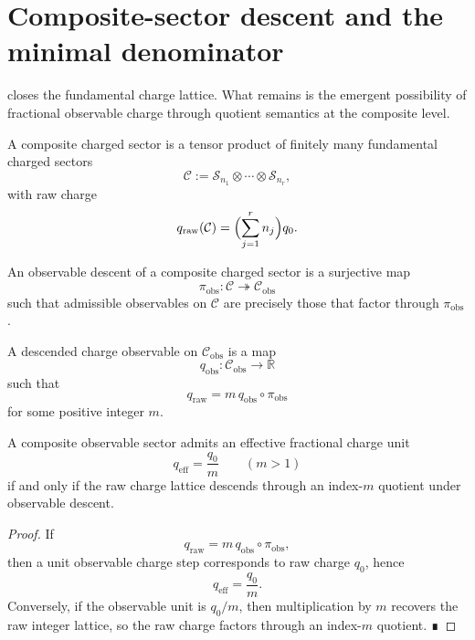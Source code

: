 \section{Composite-sector descent and the minimal denominator}
\label{sec:em-composite-quotients}
 closes the fundamental charge lattice.
What remains is the emergent possibility of fractional observable
charge through quotient semantics at the composite level.
\begin{definition}
	A composite charged sector is a tensor product of finitely many
	fundamental charged sectors
	\[
		\mathcal C:=\mathcal S_{n_1}\otimes\cdots\otimes \mathcal S_{n_r},
	\]
	with raw charge
	\[
		q_{\mathrm{raw}}(\mathcal C)=\Bigl(\sum_{j=1}^r n_j\Bigr)q_0.
	\]
\end{definition}
\begin{definition}
	An observable descent of a composite charged sector is a surjective map
	\[
		\pi_{\mathrm{obs}}:\mathcal C\twoheadrightarrow \mathcal C_{\mathrm{obs}}
	\]
	such that admissible observables on \(\mathcal C\) are precisely those
	that factor through \(\pi_{\mathrm{obs}}\).
\end{definition}
\begin{definition}
	A descended charge observable on \(\mathcal C_{\mathrm{obs}}\) is a map
	\[
		q_{\mathrm{obs}}:\mathcal C_{\mathrm{obs}}\to\mathbb R
	\]
	such that
	\[
		q_{\mathrm{raw}}=m\,q_{\mathrm{obs}}\circ \pi_{\mathrm{obs}}
	\]
	for some positive integer \(m\).
\end{definition}
\begin{theorem}
	\label{thm:em-fractional-criterion}
	A composite observable sector admits an effective fractional charge unit
	\[
		q_{\mathrm{eff}}=\frac{q_0}{m}
		\qquad (m>1)
	\]
	if and only if the raw charge lattice descends through an index-\(m\)
	quotient under observable descent.
\end{theorem}
\begin{proof}
	If
	\[
		q_{\mathrm{raw}}=m\,q_{\mathrm{obs}}\circ\pi_{\mathrm{obs}},
	\]
	then a unit observable charge step corresponds to raw charge
	\(q_0\), hence
	\[
		q_{\mathrm{eff}}=\frac{q_0}{m}.
	\]
	Conversely, if the observable unit is \(q_0/m\), then multiplication by
	\(m\) recovers the raw integer lattice, so the raw charge factors
	through an index-\(m\) quotient. ∎
\end{proof}
